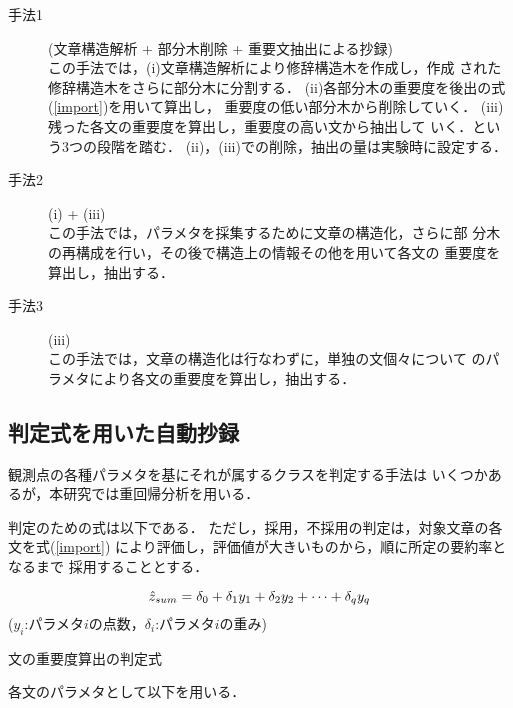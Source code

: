 \begin{description}
 \item[手法1] (文章構造解析 + 部分木削除 + 重要文抽出による抄録) \\
	    この手法では，(i)文章構造解析により修辞構造木を作成し，作成
	    された修辞構造木をさらに部分木に分割する．
	    (ii)各部分木の重要度を後出の式(\ref{import})を用いて算出し，
	    重要度の低い部分木から削除していく．
	    (iii)残った各文の重要度を算出し，重要度の高い文から抽出して
	    いく．という3つの段階を踏む．
	    (ii)，(iii)での削除，抽出の量は実験時に設定する．
 \item[手法2] (i) + (iii) \\
	    この手法では，パラメタを採集するために文章の構造化，さらに部 
	    分木の再構成を行い，その後で構造上の情報その他を用いて各文の 
	    重要度を算出し，抽出する．
 \item[手法3] (iii) \\
	    この手法では，文章の構造化は行なわずに，単独の文個々について 
	    のパラメタにより各文の重要度を算出し，抽出する．
\end{description}


\subsection{判定式を用いた自動抄録}\label{hantei}

観測点の各種パラメタを基にそれが属するクラスを判定する手法は
いくつかあるが，本研究では重回帰分析を用いる．

判定のための式は以下である．
ただし，採用，不採用の判定は，対象文章の各文を式(\ref{import})
により評価し，評価値が大きいものから，順に所定の要約率となるまで
採用することとする．

\vspace{-6ex}
\begin{center}
 \begin{equation}
  \hat{z}_{sum}=\delta_{0}+\delta_{1}y_{1}+\delta_{2}y_{2}+\cdots +\delta_{q}y_{q}
   \label{import}
   \vspace{-2ex}
 \end{equation}
 ($y_{i}$:パラメタ$i$の点数，$\delta_{i}$:パラメタ$i$の重み)

 文の重要度算出の判定式
\end{center}

各文のパラメタとして以下を用いる．

